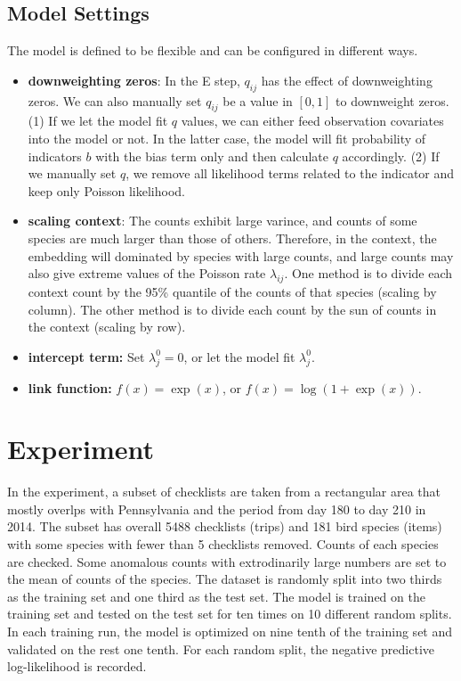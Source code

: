 \documentclass{article}
\begin{document}
\subsection{Model Settings}

The model is defined to be flexible and can be configured in different ways.  
\begin{itemize}

\item[]{\bf downweighting zeros}: In the E step, $q_{ij}$ has the effect of downweighting zeros. We can also manually set $q_{ij}$ be a value 
in $[0, 1]$ to downweight zeros. (1) If we let the model fit $q$ values, we can either feed observation covariates into the model or not. 
In the latter case, the model will fit probability of indicators $b$ with the bias term only and then calculate $q$ accordingly.
(2) If we manually set $q$, we remove all likelihood terms related to the indicator and keep only Poisson likelihood. 
\item[]{\bf scaling context}: The counts exhibit large varince, and counts of some species are much larger than those of others. 
Therefore, in the context, the embedding will dominated by species with large counts, and large counts may also give extreme 
values of the Poisson rate $\lambda_{ij}$. One method is to divide each context count by the 95\% quantile of the counts of 
that species (scaling by column). The other method is to divide each count by the sun of counts in the context (scaling by row). 

\item[]{\bf intercept term:} Set $\lambda^0_{j} = 0$, or let the model fit $\lambda^0_{j}$.

\item[]{\bf link function:} $f(x) = \exp(x)$, or $f(x) = \log(1 + \exp(x))$.
\end{itemize}



\section{Experiment}

In the experiment, a subset of checklists are taken from a rectangular area that mostly overlps with Pennsylvania and the period from 
day 180 to day 210 in 2014. The subset has overall 5488 checklists (trips) and 181 bird species (items) with some species with fewer than 
5 checklists removed. Counts of each species are checked. Some anomalous counts with extrodinarily large numbers are set to the mean 
of counts of the species. The dataset is randomly split into two thirds as the training set and one third as the test set. The model is 
trained on the training set and tested on the test set for ten times on 10 different random splits. In each training run, the model 
is optimized on nine tenth of the training set and validated on the rest one tenth. For each random split, the negative predictive 
log-likelihood is recorded. 
\end{document}
